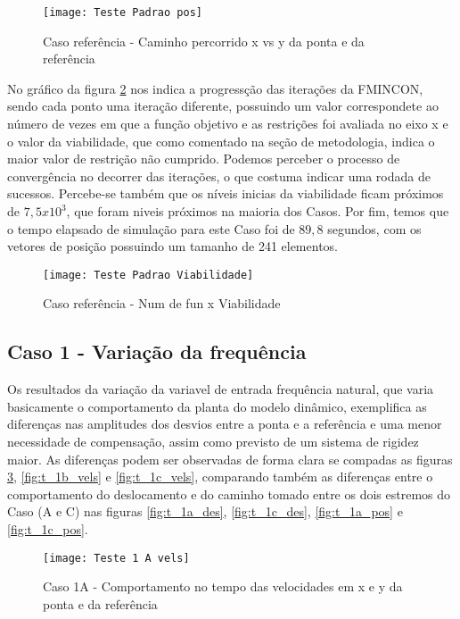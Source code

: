 \begin{figure}[!htb]
    \begin{center}
    \caption{Caso referência - Caminho percorrido x vs y da ponta e da referência}
    \texttt{[image: Teste Padrao pos]}
    \label{fig:t_padr_pos}
    \end{center}
\end{figure}

No gráfico da figura \ref{fig:t_padr_viab} nos indica a progressção das iterações da FMINCON, sendo cada
ponto uma iteração diferente, possuindo um valor correspondete ao número de vezes em que a função objetivo e as restrições foi avaliada
no eixo x e o valor da viabilidade, que como comentado na seção de metodologia, indica o maior valor de restrição não cumprido.
Podemos perceber o processo de convergência no decorrer das iterações, o que costuma indicar uma rodada de sucessos.
Percebe-se também que os níveis inicias da viabilidade ficam próximos de $7,5x10^3$, que foram niveis próximos na maioria dos Casos.
Por fim, temos que o tempo elapsado de simulação para este Caso foi de $89,8$ segundos, com os vetores de posição possuindo
um tamanho de 241 elementos.

\begin{figure}[!htb]
    \begin{center}
    \caption{Caso referência - Num de fun x Viabilidade}
    \texttt{[image: Teste Padrao Viabilidade]}
    \label{fig:t_padr_viab}
    \end{center}
\end{figure}

\subsection{Caso 1 - Variação da frequência}
Os resultados da variação da variavel de entrada frequência natural, que varia basicamente o comportamento da planta do
modelo dinâmico, exemplifica as diferenças nas amplitudes dos desvios entre a ponta e a referência e uma menor necessidade de compensação, assim como previsto
de um sistema de rigidez maior.
As diferenças podem ser observadas de forma clara se compadas as figuras \ref{fig:t_1a_vels}, \ref{fig:t_1b_vels} e \ref{fig:t_1c_vels},
comparando também as diferenças entre o comportamento do deslocamento e do caminho tomado entre os dois estremos do Caso (A e C) nas figuras
\ref{fig:t_1a_des}, \ref{fig:t_1c_des}, \ref{fig:t_1a_pos} e \ref{fig:t_1c_pos}.

\begin{figure}[!htb]
    \begin{center}
    \caption{Caso 1A - Comportamento no tempo das velocidades em x e y da ponta e da referência}
    \texttt{[image: Teste 1 A vels]}
    \label{fig:t_1a_vels}
    \end{center}
\end{figure}

